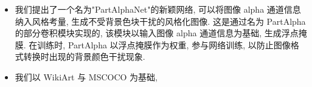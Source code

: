 \begin{itemize}
    \item 我们提出了一个名为"PartAlphaNet"的新颖网络, 可以将图像 alpha 通道信息纳入风格考量, 生成不受背景色块干扰的风格化图像. 这是通过名为 PartAlpha 的部分卷积模块实现的, 该模块以输入图像 alpha 通道信息为基础, 生成浮点掩膜. 在训练时, PartAlpha 以浮点掩膜作为权重, 参与网络训练, 以防止图像格式转换时出现的背景颜色干扰现象.
    \item 我们以 WikiArt\cite{wikiartWikiArtorgVisual} 与 MSCOCO\cite{cocodatasetCOCOCommon} 为基础, 
\end{itemize}
